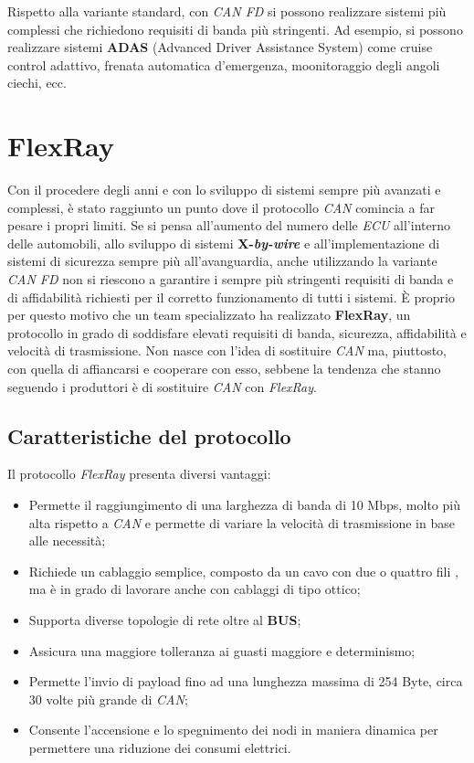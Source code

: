 Rispetto alla variante standard, con \emph{CAN FD} si possono realizzare sistemi più complessi che richiedono requisiti di banda più stringenti. Ad esempio, si possono realizzare sistemi \textbf{ADAS} (Advanced Driver Assistance System) come cruise control adattivo, frenata automatica d'emergenza, moonitoraggio degli angoli ciechi, ecc. \cite{css_electronics_canfd}

\section{FlexRay}
Con il procedere degli anni e con lo sviluppo di sistemi sempre più avanzati e complessi, è stato raggiunto un punto dove il protocollo \emph{CAN} comincia a far pesare i propri limiti. Se si pensa all'aumento del numero delle \emph{ECU} all'interno delle automobili, allo sviluppo di sistemi \textbf{X-\emph{by-wire}} e all'implementazione di sistemi di sicurezza sempre più all'avanguardia, anche utilizzando la variante \emph{CAN FD} non si riescono a garantire i sempre più stringenti requisiti di banda e di affidabilità richiesti per il corretto funzionamento di tutti i sistemi. È proprio per questo motivo che un team specializzato ha realizzato \textbf{FlexRay}, un protocollo in grado di soddisfare elevati requisiti di banda, sicurezza, affidabilità e velocità di trasmissione. Non nasce con l'idea di sostituire \emph{CAN} ma, piuttosto, con quella di affiancarsi e cooperare con esso, sebbene la tendenza che stanno seguendo i produttori è di sostituire \emph{CAN} con \emph{FlexRay}.

\subsection{Caratteristiche del protocollo}
Il protocollo \emph{FlexRay} presenta diversi vantaggi:
\begin{itemize}
    \item Permette il raggiungimento di una larghezza di banda di 10 Mbps, molto più alta rispetto a \emph{CAN} e permette di variare la velocità di trasmissione in base alle necessità;
    \item Richiede un cablaggio semplice, composto da un cavo con due o quattro fili \cite{ni_flexray}, ma è in grado di lavorare anche con cablaggi di tipo ottico;
    \item Supporta diverse topologie di rete oltre al \textbf{BUS};
    \item Assicura una maggiore tolleranza ai guasti maggiore e determinismo;
    \item Permette l'invio di payload fino ad una lunghezza massima di 254 Byte, circa 30 volte più grande di \emph{CAN};
    \item Consente l'accensione e lo spegnimento dei nodi in maniera dinamica per permettere una riduzione dei consumi elettrici.
\end{itemize}

